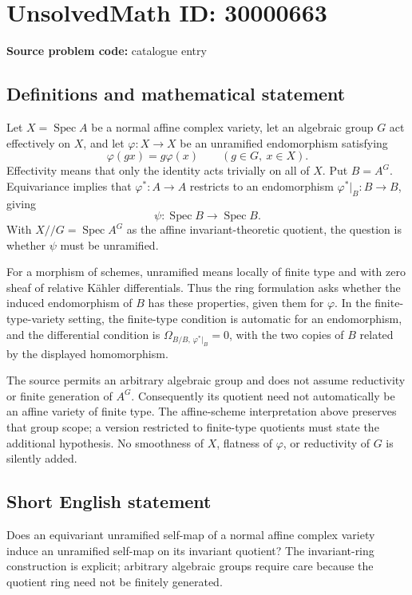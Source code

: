 \documentclass[11pt]{article}
\begin{document}
\section*{UnsolvedMath ID: 30000663}
\textbf{Source problem code:} catalogue entry
\subsection{Definitions and mathematical statement}
Let $X=\operatorname{Spec}A$ be a normal affine complex variety, let an algebraic group $G$ act effectively on $X$, and let $\varphi:X\to X$ be an unramified endomorphism satisfying
\[
\varphi(gx)=g\varphi(x)\qquad(g\in G,\ x\in X).
\]
Effectivity means that only the identity acts trivially on all of $X$. Put $B=A^G$. Equivariance implies that $\varphi^*:A\to A$ restricts to an endomorphism $\varphi^*|_B:B\to B$, giving
\[
\psi:\operatorname{Spec}B\longrightarrow\operatorname{Spec}B.
\]
With $X//G=\operatorname{Spec}A^G$ as the affine invariant-theoretic quotient, the question is whether $\psi$ must be unramified.

For a morphism of schemes, unramified means locally of finite type and with zero sheaf of relative Kähler differentials. Thus the ring formulation asks whether the induced endomorphism of $B$ has these properties, given them for $\varphi$. In the finite-type-variety setting, the finite-type condition is automatic for an endomorphism, and the differential condition is $\Omega_{B/B,\,\varphi^*|_B}=0$, with the two copies of $B$ related by the displayed homomorphism.

The source permits an arbitrary algebraic group and does not assume reductivity or finite generation of $A^G$. Consequently its quotient need not automatically be an affine variety of finite type. The affine-scheme interpretation above preserves that group scope; a version restricted to finite-type quotients must state the additional hypothesis. No smoothness of $X$, flatness of $\varphi$, or reductivity of $G$ is silently added.
\subsection{Short English statement}
Does an equivariant unramified self-map of a normal affine complex variety induce an unramified self-map on its invariant quotient? The invariant-ring construction is explicit; arbitrary algebraic groups require care because the quotient ring need not be finitely generated.
\end{document}
